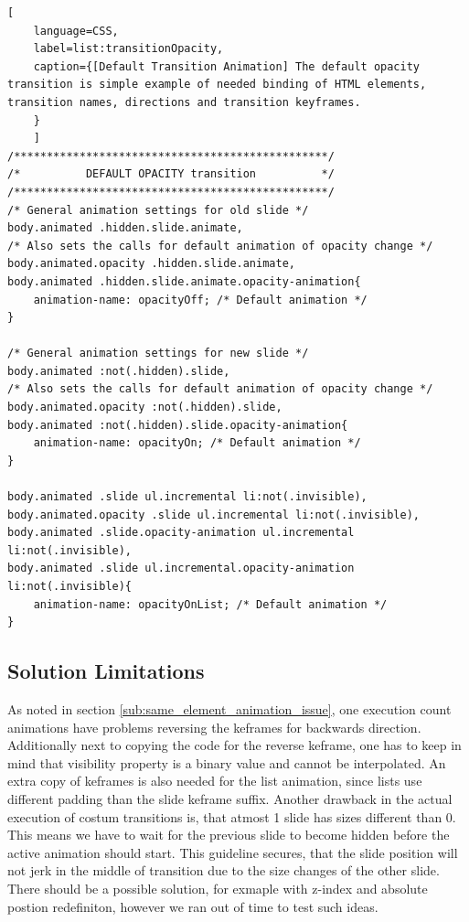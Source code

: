 \begin{minipage}{\linewidth}
	\begin{lstlisting}[
	language=CSS,
	label=list:transitionOpacity,
	caption={[Default Transition Animation] The default opacity transition is simple example of needed binding of HTML elements, transition names, directions and transition keyframes.
	}
	]
/************************************************/
/*			DEFAULT OPACITY transition			*/
/************************************************/
/* General animation settings for old slide */
body.animated .hidden.slide.animate,
/* Also sets the calls for default animation of opacity change */
body.animated.opacity .hidden.slide.animate,
body.animated .hidden.slide.animate.opacity-animation{
	animation-name: opacityOff; /* Default animation */
}

/* General animation settings for new slide */
body.animated :not(.hidden).slide,
/* Also sets the calls for default animation of opacity change */
body.animated.opacity :not(.hidden).slide,
body.animated :not(.hidden).slide.opacity-animation{
	animation-name: opacityOn; /* Default animation */
}

body.animated .slide ul.incremental li:not(.invisible),
body.animated.opacity .slide ul.incremental li:not(.invisible),
body.animated .slide.opacity-animation ul.incremental li:not(.invisible),
body.animated .slide ul.incremental.opacity-animation li:not(.invisible){
	animation-name: opacityOnList; /* Default animation */	
}
	\end{lstlisting}
\end{minipage}


\subsection{Solution Limitations} %
\label{sub:solution_limitations}

As noted in section \ref{sub:same_element_animation_issue}, one execution count animations have problems reversing the keframes for backwards direction. Additionally next to copying the code for the reverse keframe, one has to keep in mind that visibility property is a binary value and cannot be interpolated. An extra copy of keframes is also needed for the list animation, since lists use different padding than the slide keframe suffix. Another drawback in the actual execution of costum transitions is, that atmost 1 slide has sizes different than 0. This means we have to wait for the previous slide to become hidden before the active animation should start. This guideline secures, that the slide position will not jerk in the middle of transition due to the size changes of the other slide. There should be a possible solution, for exmaple with z-index and absolute postion redefiniton, however we ran out of time to test such ideas.

